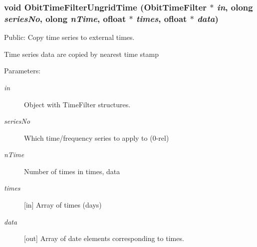 \subsubsection{\setlength{\rightskip}{0pt plus 5cm}void Obit\-Time\-Filter\-Ungrid\-Time ({\bf Obit\-Time\-Filter} $\ast$ {\em in}, {\bf olong} {\em series\-No}, {\bf olong} {\em n\-Time}, {\bf ofloat} $\ast$ {\em times}, {\bf ofloat} $\ast$ {\em data})}\label{ObitTimeFilter_8h_a21}


Public: Copy time series to external times. 

Time series data are copied by nearest time stamp \begin{Desc}
\item[Parameters:]
\begin{description}
\item[{\em in}]Object with Time\-Filter structures. \item[{\em series\-No}]Which time/frequency series to apply to (0-rel) \item[{\em n\-Time}]Number of times in times, data \item[{\em times}][in] Array of times (days) \item[{\em data}][out] Array of date elements corresponding to times. \end{description}
\end{Desc}
